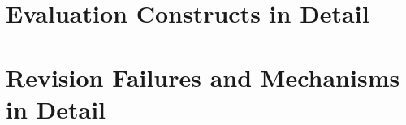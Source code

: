 

\ifnature\else\fi



\ifnature\else\fi

\ifnature\else
\section{Evaluation Constructs in Detail}
\label{app:constructs}


\fi

\ifnature\else
\section{Revision Failures and Mechanisms in Detail}
\label{app:revdetail}




\fi
